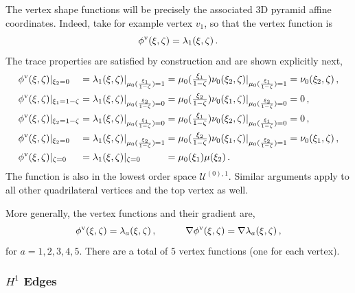 The vertex shape functions will be precisely the associated 3D pyramid affine coordinates.
Indeed, take for example vertex $v_1$, so that the vertex function is
\begin{equation*}
	\phi^\mathrm{v}(\xi,\zeta)=\lambda_1(\xi,\zeta)\,.
\end{equation*}
The trace properties are satisfied by construction and are shown explicitly next,
\begin{equation*}
	\begin{alignedat}{5}
    &\phi^\mathrm{v}(\xi,\zeta)|_{\xi_2=0}&&=\lambda_1(\xi,\zeta)|_{\mu_0(\frac{\xi_1}{1-\zeta})=1}
    	&&=\mu_0(\textstyle{\frac{\xi_1}{1-\zeta}})\nu_0(\xi_2,\zeta)|_{\mu_0(\frac{\xi_1}{1-\zeta})=1}&&=\nu_0(\xi_2,\zeta)\,,\\
    &\phi^\mathrm{v}(\xi,\zeta)|_{\xi_1=1-\zeta}&&=\lambda_1(\xi,\zeta)|_{\mu_0(\frac{\xi_2}{1-\zeta})=0}
    	&&=\mu_0(\textstyle{\frac{\xi_2}{1-\zeta}})\nu_0(\xi_1,\zeta)|_{\mu_0(\frac{\xi_2}{1-\zeta})=0}&&=0\,,\\
  	&\phi^\mathrm{v}(\xi,\zeta)|_{\xi_2=1-\zeta}&&=\lambda_1(\xi,\zeta)|_{\mu_0(\frac{\xi_1}{1-\zeta})=0}
    	&&=\mu_0(\textstyle{\frac{\xi_1}{1-\zeta}})\nu_0(\xi_2,\zeta)|_{\mu_0(\frac{\xi_1}{1-\zeta})=0}&&=0\,,\\
    &\phi^\mathrm{v}(\xi,\zeta)|_{\xi_2=0}&&=\lambda_1(\xi,\zeta)|_{\mu_0(\frac{\xi_2}{1-\zeta})=1}
    	&&=\mu_0(\textstyle{\frac{\xi_2}{1-\zeta}})\nu_0(\xi_1,\zeta)|_{\mu_0(\frac{\xi_2}{1-\zeta})=1}&&=\nu_0(\xi_1,\zeta)\,,\\
    &\phi^\mathrm{v}(\xi,\zeta)|_{\zeta=0}&&=\lambda_1(\xi,\zeta)|_{\zeta=0}
    	&&=\mu_0(\xi_1)\mu(\xi_2)\,.&&\\
	\end{alignedat}
\end{equation*}
The function is also in the lowest order space $\mathcal{U}^{(0),1}$.
Similar arguments apply to all other quadrilateral vertices and the top vertex as well.

More generally, the vertex functions and their gradient are,
\begin{equation}
    \phi^\mathrm{v}(\xi,\zeta)=\lambda_a(\xi,\zeta)\,,\qquad\quad\nabla\phi^\mathrm{v}(\xi,\zeta)=\nabla\lambda_a(\xi,\zeta)\,,
    \label{eq:PyrH1Vertex}
\end{equation}
for $a=1,2,3,4,5$.
There are a total of $5$ vertex functions (one for each vertex).

\subsubsection{\texorpdfstring{$H^1$}{H1} Edges}

